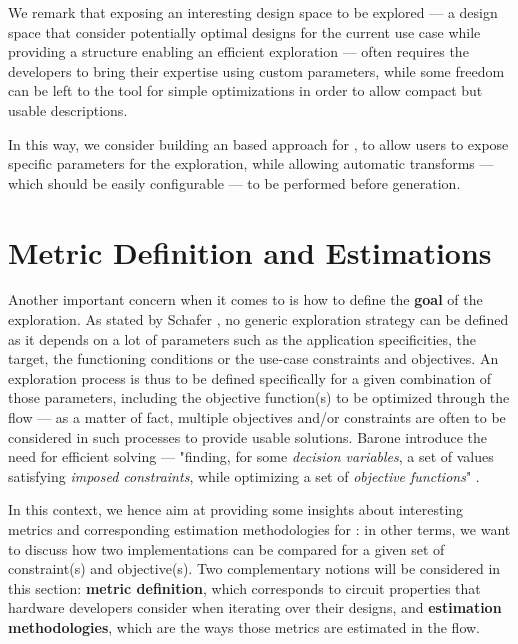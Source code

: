         We remark that exposing an interesting design space to be explored --- \ie a design space that consider potentially optimal designs for the current use case while providing a structure enabling an efficient exploration --- often requires the developers to bring their expertise using custom parameters, while some freedom can be left to the tool for simple optimizations in order to allow compact but usable descriptions.

        In this way, we consider building an  based approach for , to allow users to expose specific parameters for the exploration, while allowing automatic transforms --- which should be easily configurable --- to be performed before generation.

\clearpage
\section{Metric Definition and Estimations}
\label{ch.state:sec.metric}
    Another important concern when it comes to  is how to define the {\bf goal} of the exploration.
    As stated by Schafer \etal{} \cite{schafer_high-level_2020}, no generic exploration strategy can be defined as it depends on a lot of parameters such as the application specificities, the target, the functioning conditions or the use-case constraints and objectives.
    An exploration process is thus to be defined specifically for a given combination of those parameters, including the objective function(s) to be optimized through the flow --- as a matter of fact, multiple objectives and/or constraints are often to be considered in such processes to provide usable solutions.
    Barone \etal{} \cite{barone_multi-objective_2021} introduce the need for efficient  solving --- \ie "finding, for some {\it decision variables}, a set of values satisfying {\it imposed constraints}, while optimizing a set of {\it objective functions}" \cite{osyczka1985multicriteria}.

    In this context, we hence aim at providing some insights about interesting metrics and corresponding estimation methodologies for : in other terms, we want to discuss how two implementations can be compared for a given set of constraint(s) and objective(s).
    Two complementary notions will be considered in this section: {\bf metric definition}, which corresponds to circuit properties that hardware developers consider when iterating over their designs, and {\bf estimation methodologies}, which are the ways those metrics are estimated in the flow.

